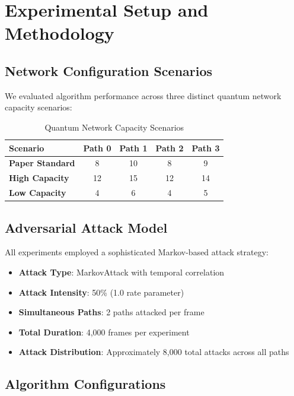 \documentclass[11pt,a4paper]{article}
\begin{document}
\section{Experimental Setup and Methodology}

\subsection{Network Configuration Scenarios}

We evaluated algorithm performance across three distinct quantum network capacity scenarios:

\begin{table}[H]
\centering
\caption{Quantum Network Capacity Scenarios}
\begin{tabular}{|l|c|c|c|c|}
\hline
\textbf{Scenario} & \textbf{Path 0} & \textbf{Path 1} & \textbf{Path 2} & \textbf{Path 3} \\
\hline
\hline
\textbf{Paper Standard} & 8 & 10 & 8 & 9 \\
\textbf{High Capacity} & 12 & 15 & 12 & 14 \\
\textbf{Low Capacity} & 4 & 6 & 4 & 5 \\
\hline
\end{tabular}
\end{table}

\subsection{Adversarial Attack Model}

All experiments employed a sophisticated Markov-based attack strategy:

\begin{itemize}
\item \textbf{Attack Type}: MarkovAttack with temporal correlation
\item \textbf{Attack Intensity}: 50\% (1.0 rate parameter)
\item \textbf{Simultaneous Paths}: 2 paths attacked per frame
\item \textbf{Total Duration}: 4,000 frames per experiment
\item \textbf{Attack Distribution}: Approximately 8,000 total attacks across all paths
\end{itemize}

\subsection{Algorithm Configurations}
\end{document}
